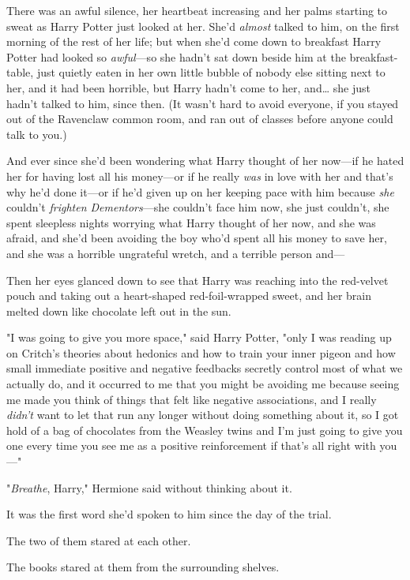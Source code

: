 There was an awful silence, her heartbeat increasing and her palms starting to
sweat as Harry Potter just looked at her. She'd \emph{almost} talked to him, on
the first morning of the rest of her life; but when she'd come down to
breakfast Harry Potter had looked so \emph{awful}---so she hadn't sat down
beside him at the breakfast-table, just quietly eaten in her own little bubble
of nobody else sitting next to her, and it had been horrible, but Harry hadn't
come to her, and{\ldots} she just hadn't talked to him, since then. (It wasn't
hard to avoid everyone, if you stayed out of the Ravenclaw common room, and ran
out of classes before anyone could talk to you.)

And ever since she'd been wondering what Harry thought of her now---if he hated
her for having lost all his money---or if he really \emph{was} in love with her
and that's why he'd done it---or if he'd given up on her keeping pace with him
because \emph{she} couldn't \emph{frighten Dementors}---she couldn't face him
now, she just couldn't, she spent sleepless nights worrying what Harry thought
of her now, and she was afraid, and she'd been avoiding the boy who'd spent all
his money to save her, and she was a horrible ungrateful wretch, and a terrible
person and---

Then her eyes glanced down to see that Harry was reaching into the red-velvet
pouch and taking out a heart-shaped red-foil-wrapped sweet, and her brain
melted down like chocolate left out in the sun.

"I was going to give you more space," said Harry Potter, "only I was reading up
on Critch's theories about hedonics and how to train your inner pigeon and how
small immediate positive and negative feedbacks secretly control most of what
we actually do, and it occurred to me that you might be avoiding me because
seeing me made you think of things that felt like negative associations, and I
really \emph{didn't} want to let that run any longer without doing something
about it, so I got hold of a bag of chocolates from the Weasley twins and I'm
just going to give you one every time you see me as a positive reinforcement if
that's all right with you---"

"\emph{Breathe}, Harry," Hermione said without thinking about it.

It was the first word she'd spoken to him since the day of the trial.

The two of them stared at each other.

The books stared at them from the surrounding shelves.

